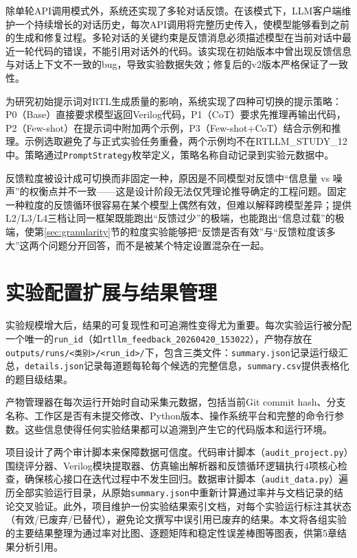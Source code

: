 除单轮API调用模式外，系统还实现了多轮对话反馈。在该模式下，LLM客户端维护一个持续增长的对话历史，每次API调用将完整历史传入，使模型能够看到之前的生成和修复过程。多轮对话的关键约束是反馈消息必须描述模型在当前对话中最近一轮代码的错误，不能引用对话外的代码。该实现在初始版本中曾出现反馈信息与对话上下文不一致的bug，导致实验数据失效；修复后的v2版本严格保证了一致性。

为研究初始提示词对RTL生成质量的影响，系统实现了四种可切换的提示策略\cite{cot}：P0（Base）直接要求模型返回Verilog代码，P1（CoT）要求先推理再输出代码，P2（Few-shot）在提示词中附加两个示例，P3（Few-shot+CoT）结合示例和推理。示例选取避免了与正式实验任务重叠，两个示例均不在RTLLM\_STUDY\_12中。策略通过\texttt{PromptStrategy}枚举定义，策略名称自动记录到实验元数据中。

反馈粒度被设计成可切换而非固定一种，原因是不同模型对反馈中``信息量 vs 噪声''的权衡点并不一致——这是设计阶段无法仅凭理论推导确定的工程问题。固定一种粒度的反馈循环很容易在某个模型上偶然有效，但难以解释跨模型差异；提供L2/L3/L4三档让同一框架既能跑出``反馈过少''的极端，也能跑出``信息过载''的极端，使第\ref{sec:granularity}节的粒度实验能够把``反馈是否有效''与``反馈粒度该多大''这两个问题分开回答，而不是被某个特定设置混杂在一起。

\section{实验配置扩展与结果管理}

实验规模增大后，结果的可复现性和可追溯性变得尤为重要。每次实验运行被分配一个唯一的\texttt{run\_id}（如\texttt{rtllm\_feedback\_20260420\_153022}），产物存放在\texttt{outputs/runs/<类别>/<run\_id>/}下，包含三类文件：\texttt{summary.json}记录运行级汇总，\texttt{details.json}记录每道题每轮每个候选的完整信息，\texttt{summary.csv}提供表格化的题目级结果。

产物管理器在每次运行开始时自动采集元数据，包括当前Git commit hash、分支名称、工作区是否有未提交修改、Python版本、操作系统平台和完整的命令行参数。这些信息使得任何实验结果都可以追溯到产生它的代码版本和运行环境。

项目设计了两个审计脚本来保障数据可信度。代码审计脚本（\texttt{audit\_project.py}）围绕评分器、Verilog模块提取器、仿真输出解析器和反馈循环逻辑执行4项核心检查，确保核心接口在迭代过程中不发生回归。数据审计脚本（\texttt{audit\_data.py}）遍历全部实验运行目录，从原始\texttt{summary.json}中重新计算通过率并与文档记录的结论交叉验证。此外，项目维护一份实验结果索引文档，对每个实验运行标注其状态（有效/已废弃/已替代），避免论文撰写中误引用已废弃的结果。本文将各组实验的主要结果整理为通过率对比图、逐题矩阵和稳定性误差棒图等图表，供第5章结果分析引用。

